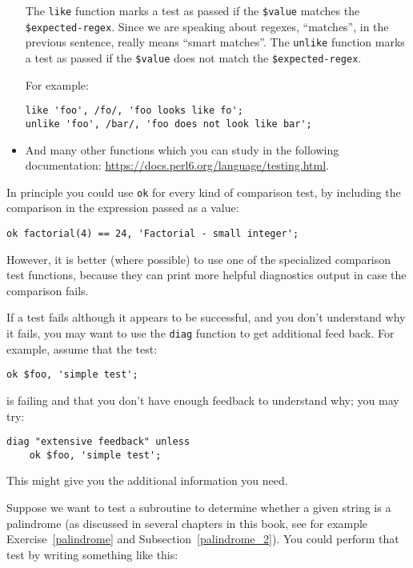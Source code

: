 \begin{itemize}
The {\tt like} function marks a test as passed if the 
\verb'$value' matches the \verb'$expected-regex'. Since 
we are speaking about regexes, ``matches'', in the 
previous sentence, really means ``smart matches''. The 
{\tt unlike} function marks a test as passed if the 
\verb'$value' does not match the \verb'$expected-regex'.

For example:
\begin{verbatim}
like 'foo', /fo/, 'foo looks like fo';
unlike 'foo', /bar/, 'foo does not look like bar';
\end{verbatim}

\item And many other functions which you can study in the 
following documentation: \url{https://docs.perl6.org/language/testing.html}.

\end{itemize}

In principle you could use {\tt ok} for every kind of 
comparison test, by including the comparison in the 
expression passed as a value:

\begin{verbatim}
ok factorial(4) == 24, 'Factorial - small integer';
\end{verbatim}

However, it is better (where possible) to use one of the 
specialized comparison test functions, because they can 
print more helpful diagnostics output in case the comparison 
fails.

If a test fails although it appears to be successful, and 
you don't understand why it fails, you may want to use the 
\verb'diag' function to get additional feed back. For example,
assume that the test:

\begin{verbatim}
ok $foo, 'simple test';
\end{verbatim} 

is failing and that you don't have enough feedback to 
understand why; you may try:

\begin{verbatim}
diag "extensive feedback" unless
    ok $foo, 'simple test';
\end{verbatim}

This might give you the additional information you need.

Suppose we want to test a subroutine to determine whether a 
given string is a palindrome (as discussed in several chapters 
in this book, see for example Exercise~\ref{palindrome} and 
Subsection~\ref{palindrome_2}). You could perform that test 
by writing something like this:

